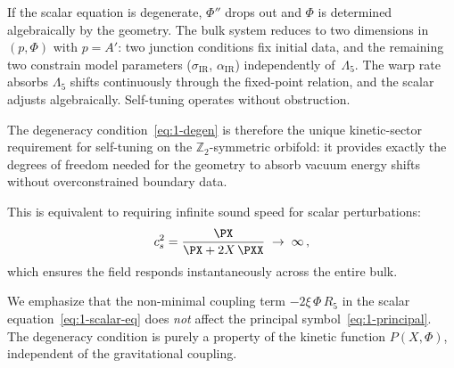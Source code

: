 If the scalar equation is degenerate, $\Phi''$ drops out and $\Phi$ is determined algebraically by the geometry. The bulk system reduces to two dimensions in $(p, \Phi)$ with $p = A'$: two junction conditions fix initial data, and the remaining two constrain model parameters ($\sigma_{\mathrm{IR}}$, $\alpha_{\mathrm{IR}}$) independently of~$\Lambda_5$. The warp rate absorbs $\Lambda_5$ shifts continuously through the fixed-point relation, and the scalar adjusts algebraically. Self-tuning operates without obstruction.

The degeneracy condition~\eqref{eq:1-degen} is therefore the unique kinetic-sector requirement for self-tuning on the $\mathbb{Z}_2$-symmetric orbifold: it provides exactly the degrees of freedom needed for the geometry to absorb vacuum energy shifts without overconstrained boundary data.

This is equivalent to requiring infinite sound speed for scalar perturbations:
\begin{equation}
\label{eq:1-cs-inf}
c_s^2 = \frac{\PX}{\PX + 2X\,\PXX} \;\to\; \infty\,,
\end{equation}
which ensures the field responds instantaneously across the entire bulk.

We emphasize that the non-minimal coupling term $-2\xi\,\Phi\, R_5$ in the scalar equation~\eqref{eq:1-scalar-eq} does \emph{not} affect the principal symbol~\eqref{eq:1-principal}. The degeneracy condition is purely a property of the kinetic function $P(X, \Phi)$, independent of the gravitational coupling.

